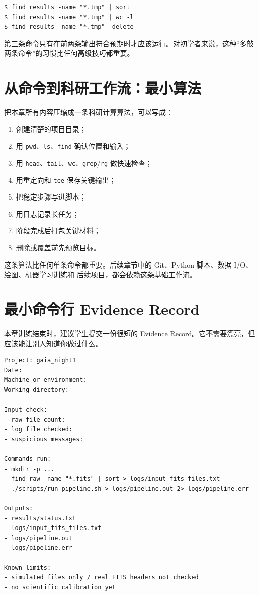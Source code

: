 \begin{examplebox}[删除前先预览]
\begin{lstlisting}[style=terminal]
$ find results -name "*.tmp" | sort
$ find results -name "*.tmp" | wc -l
$ find results -name "*.tmp" -delete
\end{lstlisting}
\end{examplebox}

第三条命令只有在前两条输出符合预期时才应该运行。对初学者来说，这种“多敲两条命令”的习惯比任何高级技巧都重要。

\section{从命令到科研工作流：最小算法}

把本章所有内容压缩成一条科研计算算法，可以写成：

\begin{enumerate}
    \item 创建清楚的项目目录；
    \item 用 \texttt{pwd}、\texttt{ls}、\texttt{find} 确认位置和输入；
    \item 用 \texttt{head}、\texttt{tail}、\texttt{wc}、\texttt{grep}/\texttt{rg} 做快速检查；
    \item 用重定向和 \texttt{tee} 保存关键输出；
    \item 把稳定步骤写进脚本；
    \item 用日志记录长任务；
    \item 阶段完成后打包关键材料；
    \item 删除或覆盖前先预览目标。
\end{enumerate}

这条算法比任何单条命令都重要。后续章节中的 Git、Python 脚本、数据 I/O、绘图、机器学习训练和 后续项目，都会依赖这条基础工作流。

\section{最小命令行 Evidence Record}

本章训练结束时，建议学生提交一份很短的 Evidence Record。它不需要漂亮，但应该能让别人知道你做过什么。

\begin{examplebox}[运行记录模板]
\begin{lstlisting}[style=terminal]
Project: gaia_night1
Date:
Machine or environment:
Working directory:

Input check:
- raw file count:
- log file checked:
- suspicious messages:

Commands run:
- mkdir -p ...
- find raw -name "*.fits" | sort > logs/input_fits_files.txt
- ./scripts/run_pipeline.sh > logs/pipeline.out 2> logs/pipeline.err

Outputs:
- results/status.txt
- logs/input_fits_files.txt
- logs/pipeline.out
- logs/pipeline.err

Known limits:
- simulated files only / real FITS headers not checked
- no scientific calibration yet
\end{lstlisting}
\end{examplebox}

